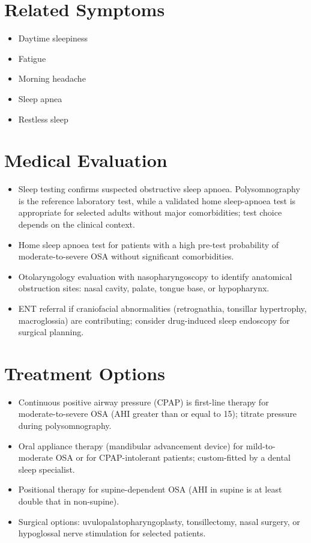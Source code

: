 \section*{Related Symptoms}
\begin{itemize}
  \item Daytime sleepiness
  \item Fatigue
  \item Morning headache
  \item Sleep apnea
  \item Restless sleep
\end{itemize}

\section*{Medical Evaluation}
\begin{itemize}
  \item Sleep testing confirms suspected obstructive sleep apnoea. Polysomnography is the reference laboratory test, while a validated home sleep-apnoea test is appropriate for selected adults without major comorbidities; test choice depends on the clinical context.
  \item Home sleep apnoea test for patients with a high pre-test probability of moderate-to-severe OSA without significant comorbidities.
  \item Otolaryngology evaluation with nasopharyngoscopy to identify anatomical obstruction sites: nasal cavity, palate, tongue base, or hypopharynx.
  \item ENT referral if craniofacial abnormalities (retrognathia, tonsillar hypertrophy, macroglossia) are contributing; consider drug-induced sleep endoscopy for surgical planning.
\end{itemize}

\section*{Treatment Options}
\begin{itemize}
  \item Continuous positive airway pressure (CPAP) is first-line therapy for moderate-to-severe OSA (AHI greater than or equal to 15); titrate pressure during polysomnography.
  \item Oral appliance therapy (mandibular advancement device) for mild-to-moderate OSA or for CPAP-intolerant patients; custom-fitted by a dental sleep specialist.
  \item Positional therapy for supine-dependent OSA (AHI in supine is at least double that in non-supine).
  \item Surgical options: uvulopalatopharyngoplasty, tonsillectomy, nasal surgery, or hypoglossal nerve stimulation for selected patients.
\end{itemize}

